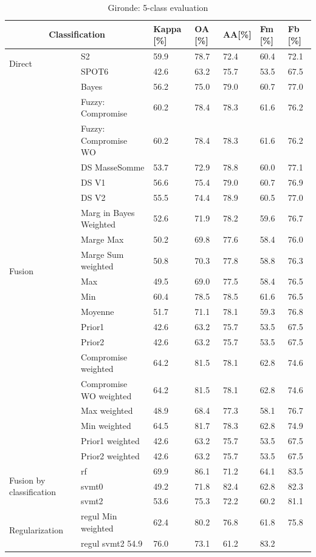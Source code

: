 \documentclass[10pt]{article}
\newcommand{\region}{finistere}
\begin{document}
\begin{table}[H]
	\centering
	\begin{tabular}{p{1.8cm}llllll}\toprule
		 \multicolumn{2}{c}{\textbf{Classification}}& \textbf{Kappa} [\%] & \textbf{OA} [\%] & \textbf{AA}[\%] & \textbf{Fm} [\%] & \textbf{Fb} [\%]\\\hline
		\multirow{2}{*}{Direct}	& S2 & 59.9 & 78.7 & 72.4 & 60.4 & 72.1 \\
		& SPOT6 & 42.6 & 63.2 & 75.7 & 53.5 & 67.5 \\\hline
		\multirow{20}{*}{Fusion} & Bayes & 56.2 & 75.0 & 79.0 & 60.7 & 77.0 \\
		& Fuzzy: Compromise & 60.2 & 78.4 & 78.3 & 61.6 & 76.2 \\
		& Fuzzy: Compromise WO & 60.2 & 78.4 & 78.3 & 61.6 & 76.2 \\
		& DS MasseSomme & 53.7 & 72.9 & 78.8 & 60.0 & 77.1 \\
		& DS V1 & 56.6 & 75.4 & 79.0 & 60.7 & 76.9 \\
		& DS V2 & 55.5 & 74.4 & 78.9 & 60.5 & 77.0 \\
		& Marg in Bayes Weighted & 52.6 & 71.9 & 78.2 & 59.6 & 76.7 \\
		& Marge Max & 50.2 & 69.8 & 77.6 & 58.4 & 76.0 \\
		& Marge Sum weighted & 50.8 & 70.3 & 77.8 & 58.8 & 76.3 \\
		& Max & 49.5 & 69.0 & 77.5 & 58.4 & 76.5 \\
		& Min & 60.4 & 78.5 & 78.5 & 61.6 & 76.5 \\
		& Moyenne & 51.7 & 71.1 & 78.1 & 59.3 & 76.8 \\
		& Prior1 & 42.6 & 63.2 & 75.7 & 53.5 & 67.5 \\
		& Prior2 & 42.6 & 63.2 & 75.7 & 53.5 & 67.5 \\
		& Compromise weighted & 64.2 & 81.5 & 78.1 & 62.8 & 74.6 \\
		& Compromise WO weighted & 64.2 & 81.5 & 78.1 & 62.8 & 74.6 \\
		& Max weighted & 48.9 & 68.4 & 77.3 & 58.1 & 76.7 \\
		& Min weighted & 64.5 & 81.7 & 78.3 & 62.8 & 74.9 \\
		& Prior1 weighted & 42.6 & 63.2 & 75.7 & 53.5 & 67.5 \\
		& Prior2 weighted & 42.6 & 63.2 & 75.7 & 53.5 & 67.5 \\\hline
		\multirow{3}{*}{\parbox{1.8cm}{Fusion by classification}} & rf & 69.9 & 86.1 & 71.2 & 64.1 & 83.5 \\
		& svmt0 & 49.2 & 71.8 & 82.4 & 62.8 & 82.3 \\
		& svmt2 & 53.6 & 75.3 & 72.2 & 60.2 & 81.1 \\\hline
		\multirow{2}{*}{Regularization} 		& regul Min weighted & 62.4 & 80.2 & 76.8 & 61.8 & 75.8 \\
		& regul svmt2 54.9 & 76.0 & 73.1 & 61.2 & 83.2 \\
	\bottomrule
	\end{tabular}
	\caption{Gironde: 5-class evaluation}
	\label{table:eval\region}
\end{table}
\end{document}
